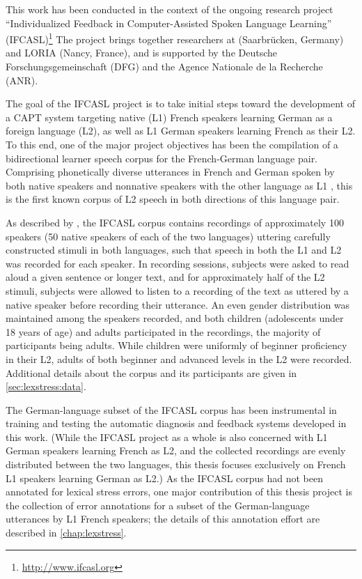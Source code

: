 This work has been conducted in the context of the ongoing 
research project ``Individualized Feedback in Computer-Assisted Spoken Language Learning'' (IFCASL)\footnote{\url{http://www.ifcasl.org}}
The project brings together researchers 
 at 
{\thesisUniversity} 
 (Saarbrücken, Germany) and LORIA (Nancy, France), and 
is supported by the Deutsche Forschungsgemeinschaft (DFG) and the Agence Nationale de la Recherche (ANR).

The goal of the IFCASL project is to take initial steps toward the development of a CAPT system targeting
native (L1) French speakers learning German as a foreign language (L2), 
as well as
L1 German speakers learning French as their L2. To this end, one of the major project objectives has been the compilation of a bidirectional learner speech corpus for the French-German language pair. Comprising phonetically diverse utterances in French and German spoken by both native speakers and nonnative speakers with the other language as L1 \citep{Fauth2014,Trouvain2013}, this is the first known corpus of L2 speech in both directions of this language pair.

As described by \textcite{Trouvain2013,Fauth2014}, the IFCASL corpus contains recordings of approximately 100 speakers (50 native speakers of each of the two languages) uttering carefully constructed stimuli in both languages, such that speech in both the L1 and L2 was recorded for each speaker. In recording sessions, subjects were asked to read aloud a given sentence or longer text, and for approximately half of the L2 stimuli, subjects were allowed to listen to a recording of the text as uttered by a native speaker 
before recording their utterance. An even gender distribution was maintained among the speakers recorded, and both children (adolescents under 18 years of age) and adults participated in the recordings, the majority of participants being adults. While children were uniformly of beginner proficiency in their L2, adults of both beginner and advanced levels in the L2 were recorded. Additional details about the corpus and its participants are given in \cref{sec:lexstress:data}.


The German-language subset of the IFCASL corpus has been instrumental in training and testing the automatic diagnosis and feedback systems developed in this work.
 (While the IFCASL project as a whole is also concerned with L1 German speakers learning French as L2, and the 
 collected recordings are
 evenly distributed between the two languages, this thesis focuses exclusively on French L1 speakers learning German as L2.) 
As the IFCASL corpus had not been annotated for lexical stress errors, one major contribution of this thesis project is 
the collection of error annotations 
for a subset of the German-language utterances by L1 French speakers; the details of this annotation effort are described in \cref{chap:lexstress}. 

